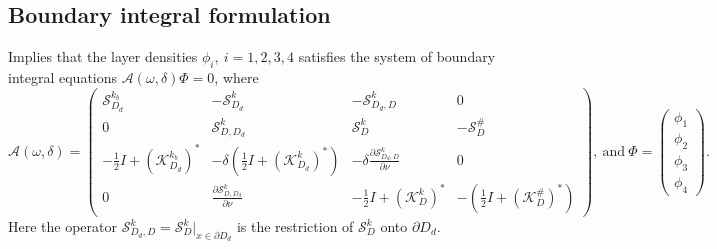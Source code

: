 \documentclass[a4paper]{article}
\theoremstyle{definition}
\newcommand{\A}{\mathcal{A}}
\newcommand{\Scrystal}{\mathcal{S}_D^\#}
\newcommand{\KstarC}{(\mathcal{K}_D^{\#})^*}
\begin{document}
\subsection{Boundary integral formulation}
Implies that the layer densities $\phi_i,\ i=1,2,3,4$ satisfies the system of boundary integral equations $\A(\omega, \delta)\Phi = 0$, where
\begin{equation} \label{eq:A}
\A(\omega, \delta) = 
\begin{pmatrix}
\mathcal{S}_{D_d}^{k_b} &  -\mathcal{S}_{D_d}^{k} & -\mathcal{S}_{D_d,D}^{k} & 0 \\
0 & \mathcal{S}_{D,D_d}^k & \mathcal{S}_{D}^k & -\Scrystal \\
-\frac{1}{2}I+ (\mathcal{K}_{D_d}^{k_b})^*& -\delta\left( \frac{1}{2}I+ (\mathcal{K}_{D_d}^{k})^*\right) & -\delta \frac{\partial \mathcal{S}_{D_d,D}^{k}}{\partial \nu} & 0 \\
0 & \frac{\partial \mathcal{S}_{D,D_d}^{k}}{\partial \nu} & -\frac{1}{2}I+ (\mathcal{K}_D^{k})^* & -\left( \frac{1}{2}I+ \KstarC\right)
\end{pmatrix}, 
\ \text{and}  \ \Phi= 
\begin{pmatrix}
\phi_1\\
\phi_2 \\
\phi_3 \\
\phi_4
\end{pmatrix}.
\end{equation}
Here the operator $\mathcal{S}_{D_d,D}^{k} = \mathcal{S}_{D}^{k}|_{x\in \partial D_d}$ is the restriction of $\mathcal{S}_{D}^{k}$ onto $\partial D_d$.
\end{document}
